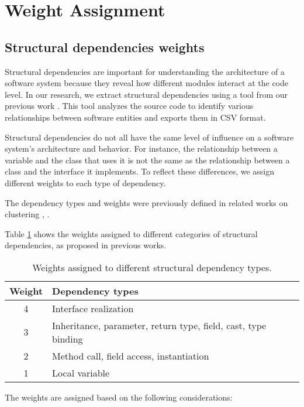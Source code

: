 \section{Weight Assignment}
\label{sec:weight_assignment}

\subsection{Structural dependencies weights}
\label{subsec:structural_weights}

Structural dependencies are important for understanding the architecture of a software system because they reveal how different modules interact at the code level. In our research, we extract structural dependencies using a tool from our previous work \cite{b4}. This tool analyzes the source code to identify various relationships between software entities and exports them in CSV format.

Structural dependencies do not all have the same level of influence on a software system’s architecture and behavior. For instance, the relationship between a variable and the class that uses it is not the same as the relationship between a class and the interface it implements. To reflect these differences, we assign different weights to each type of dependency.

The dependency types and weights were previously defined in related works on clustering \cite{SoraConti}, \cite{Finding-key-classes}.

Table \ref{tab:structural_weights} shows the weights assigned to different categories of structural dependencies, as proposed in previous works.

\begin{table}[htbp]
\centering
\begin{tabular}{|c|l|}
\hline
\textbf{Weight} & \textbf{Dependency types} \\
\hline
4 & Interface realization \\
3 & Inheritance, parameter, return type, field, cast, type binding \\
2 & Method call, field access, instantiation \\
1 & Local variable \\
\hline
\end{tabular}
\caption{Weights assigned to different structural dependency types. \cite{Finding-key-classes}}
\label{tab:structural_weights}
\end{table}

The weights are assigned based on the following considerations:

